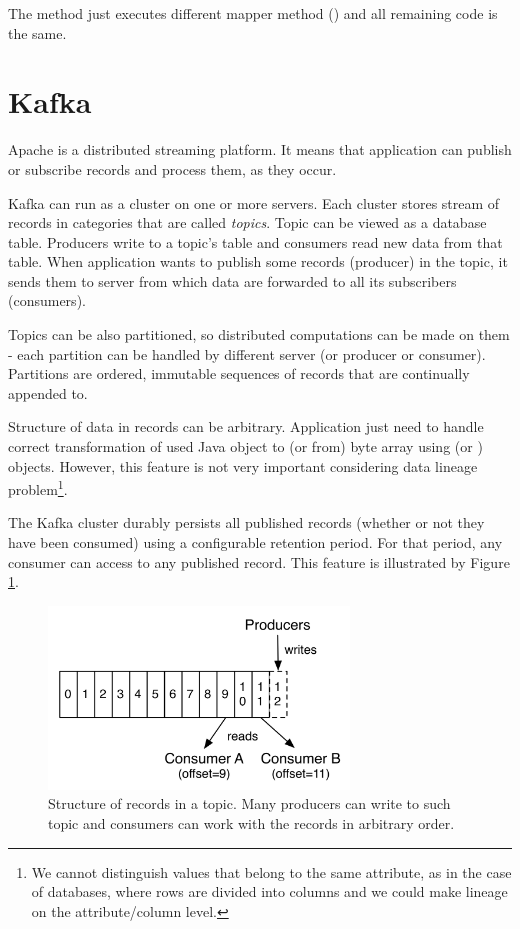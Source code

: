 The  method just executes different mapper method ()
and all remaining code is the same.




\section{Kafka \label{frameworks:kafka}}

Apache \citet{Kafka} is a distributed streaming platform.
It means that application can publish or subscribe records and
process them, as they occur.

Kafka can run as a cluster on one or more servers.
Each cluster stores stream of records in categories that are called \textit{topics}.
Topic can be viewed as a database table. Producers write to a topic's table
and consumers read new data from that table.
When application wants to publish some records (producer) in the topic,
it sends them to server from which data are forwarded to all its subscribers (consumers).

Topics can be also partitioned, so distributed computations can be made
on them - each partition can be handled by different server (or producer or consumer).
Partitions are ordered, immutable sequences of records that are continually appended to.

Structure of data in records can be arbitrary. Application just need to handle
correct transformation of used Java object to (or from) byte array using
 (or ) objects.
However, this feature is not very important considering data lineage problem\footnote{
  We cannot distinguish values that belong to the same attribute, as in the case
  of databases, where rows are divided into columns and we could make
  lineage on the attribute/column level.
}.

The Kafka cluster durably persists all published records (whether or not they have been consumed)
using a configurable retention period. For that period, any consumer can access
to any published record. This feature is illustrated by Figure \ref{frameworks:kafka:topic}.

\begin{figure}[h]
  \center
  \includegraphics[width=80mm]{img/kafka-topic-structure.png}
  \caption{Structure of records in a topic. Many producers can write to such topic and consumers can work with the records in arbitrary order.}
  \label{frameworks:kafka:topic}
\end{figure}

